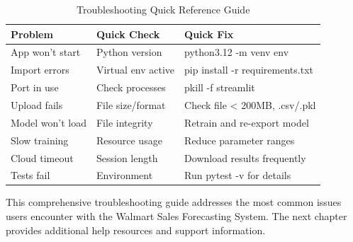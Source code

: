 \begin{table}[H]
	\centering
	\begin{tabularx}{\textwidth}{|X|X|X|}
		\hline
		\textbf{Problem} & \textbf{Quick Check} & \textbf{Quick Fix} \\
		\hline
		App won't start & Python version & python3.12 -m venv env \\
		Import errors & Virtual env active & pip install -r requirements.txt \\
		Port in use & Check processes & pkill -f streamlit \\
		Upload fails & File size/format & Check file < 200MB, .csv/.pkl \\
		Model won't load & File integrity & Retrain and re-export model \\
		Slow training & Resource usage & Reduce parameter ranges \\
		Cloud timeout & Session length & Download results frequently \\
		Tests fail & Environment & Run pytest -v for details \\
		\hline
	\end{tabularx}
	\caption{Troubleshooting Quick Reference Guide}
	\label{tab:troubleshooting_reference}
\end{table}


This comprehensive troubleshooting guide addresses the most common issues users encounter with the Walmart Sales Forecasting System. The next chapter provides additional help resources and support information.